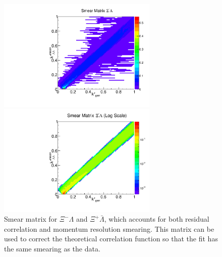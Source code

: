\begin{figure}[h]
\begin{minipage}{18pc}
\includegraphics[width=18pc]{Figures/SmearMatrices/2016-7-19-SmearMatrixXiCLambdaNormLLAA.pdf}
\end{minipage}\hspace{2pc}
\begin{minipage}{18pc}
\includegraphics[width=18pc]{Figures/SmearMatrices/2016-7-19-SmearMatrixXiCLambdaNormLLAALog.pdf}
\end{minipage} 
\caption[Smear matrix -- $\Xi^{-}\Lambda$ and $\Xi^{+}\bar{\Lambda}$]{
Smear matrix for $\Xi^{-}\Lambda$ and $\Xi^{+}\bar{\Lambda}$, which accounts for both residual correlation and momentum resolution smearing. This matrix can be used to correct the theoretical correlation function so that the fit has the same smearing as the data.
}
\end{figure}

